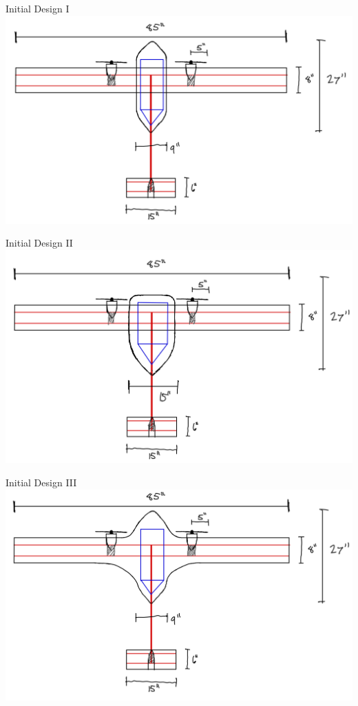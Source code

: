 \documentclass{beamer}
\begin{document}
    \begin{frame}{Initial Design I}
        \centering
        \includegraphics[width=\linewidth]{figures/Initial Design 1.jpeg}
    \end{frame}

    \begin{frame}{Initial Design II}
        \centering
        \includegraphics[width=\linewidth]{figures/Initial Design 2.jpeg}
    \end{frame}
    
    
    \begin{frame}{Initial Design III}
        \centering
        \includegraphics[width=\linewidth]{figures/Initial Design 3.jpeg}
    \end{frame}
\end{document}
